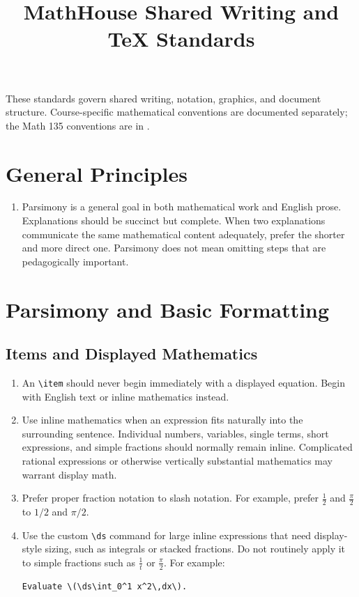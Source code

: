 \documentclass[document,notitlepage]{mhdocument}
\title{MathHouse Shared Writing and TeX Standards}
\date{}
\begin{document}
\setcounter{secnumdepth}{-1}
\maketitle

These standards govern shared writing, notation, graphics, and document structure. Course-specific mathematical conventions are documented separately; the Math 135 conventions are in .

\section{General Principles}
\begin{enumerate}
\item Parsimony is a general goal in both mathematical work and English prose. Explanations should be succinct but complete. When two explanations communicate the same mathematical content adequately, prefer the shorter and more direct one. Parsimony does not mean omitting steps that are pedagogically important.
\end{enumerate}

\section{Parsimony and Basic Formatting}

\subsection{Items and Displayed Mathematics}

\begin{enumerate}[resume]
\item An \verb|\item| should never begin immediately with a displayed equation. Begin with English text or inline mathematics instead.

\item Use inline mathematics when an expression fits naturally into the surrounding sentence. Individual numbers, variables, single terms, short expressions, and simple fractions should normally remain inline. Complicated rational expressions or otherwise vertically substantial mathematics may warrant display math.

\item Prefer proper fraction notation to slash notation. For example, prefer \(\frac{1}{2}\) and \(\frac{\pi}{2}\) to \(1/2\) and \(\pi/2\).

\item Use the custom \verb|\ds| command for large inline expressions that need display-style sizing, such as integrals or stacked fractions. Do not routinely apply it to simple fractions such as \(\frac{1}{t}\) or \(\frac{\pi}{2}\). For example:
\begin{verbatim}
Evaluate \(\ds\int_0^1 x^2\,dx\).
\end{verbatim}
\end{enumerate}
\end{document}
